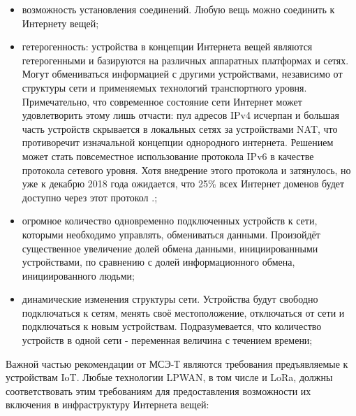 \begin{itemize}
	\item возможность установления соединений. Любую вещь можно соединить к Интернету вещей;
	\item гетерогенность: устройства в концепции Интернета вещей являются гетерогенными и базируются на различных аппаратных платформах и сетях. 
		Могут обмениваться информацией с другими устройствами, независимо от структуры сети и применяемых технологий транспортного уровня. 
		Примечательно, что современное состояние сети Интернет может удовлетворить этому лишь отчасти: пул адресов IPv4 исчерпан и большая часть устройств скрывается в локальных сетях за устройствами NAT, что противоречит изначальной концепции однородного интернета. 
		Решением может стать повсеместное использование протокола IPv6 в качестве протокола сетевого уровня. 
		Хотя внедрение этого протокола и затянулось, но уже к декабрю 2018 года ожидается, что 25\% всех Интернет доменов будет доступно через этот протокол \cite{pickard2017}.;
	\item огромное количество одновременно подключенных устройств к сети, 
которыми необходимо управлять, обмениваться данными. Произойдёт существенное 
увеличение долей обмена данными, инициированными устройствами, по сравнению с 
долей информационного обмена, инициированного людьми;
	\item динамические изменения структуры сети. Устройства будут свободно подключаться к сетям, менять своё местоположение, отключаться от сети и подключаться к новым устройствам. Подразумевается, что количество устройств в одной сети - переменная величина с течением времени;
\end{itemize}

Важной частью рекомендации от МСЭ-Т являются требования	предъявляемые к 
устройствам IoT. Любые технологии LPWAN, в том числе и LoRa\texttrademark, 
должны соответствовать этим требованиям для предоставления возможности их 
включения в инфраструктуру Интернета вещей:

